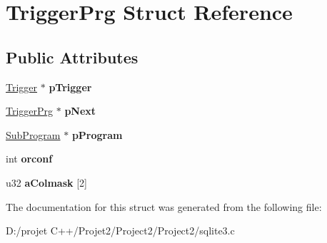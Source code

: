 \hypertarget{struct_trigger_prg}{}\section{Trigger\+Prg Struct Reference}
\label{struct_trigger_prg}
\subsection*{Public Attributes}
\begin{DoxyCompactItemize}
\item 
\mbox{\label{struct_trigger_prg_af70e5a74c954bc7a1eb8ee1162c40368}} 
\mbox{\hyperlink{struct_trigger}{Trigger}} $\ast$ {\bfseries p\+Trigger}
\item 
\mbox{\label{struct_trigger_prg_a551b8a29a8c4ff785afab1596e5d8710}} 
\mbox{\hyperlink{struct_trigger_prg}{Trigger\+Prg}} $\ast$ {\bfseries p\+Next}
\item 
\mbox{\label{struct_trigger_prg_aa770aee270c7c5df85578dc4a6686134}} 
\mbox{\hyperlink{struct_sub_program}{Sub\+Program}} $\ast$ {\bfseries p\+Program}
\item 
\mbox{\label{struct_trigger_prg_aa475acda58c472b3491f6aa17020bf68}} 
int {\bfseries orconf}
\item 
\mbox{\label{struct_trigger_prg_aeac0a4cd1f1d287981ae33c4d171b614}} 
u32 {\bfseries a\+Colmask} \mbox{[}2\mbox{]}
\end{DoxyCompactItemize}


The documentation for this struct was generated from the following file\+:\begin{DoxyCompactItemize}
\item 
D\+:/projet C++/\+Projet2/\+Project2/\+Project2/sqlite3.\+c\end{DoxyCompactItemize}
